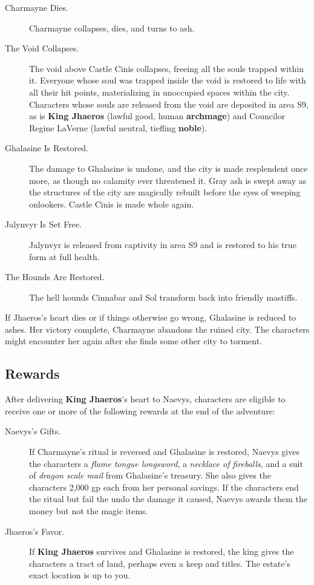 \documentclass[10pt,a4paper,twoside,bg=print,twocolumn,openany,nodeprecatedcode]{dndbook}
\begin{document}
\begin{description}
\item[Charmayne Dies.]
Charmayne collapses, dies, and turns to ash.
\item[The Void Collapses.]
The void above Castle Cinis collapses, freeing all the souls trapped within it. Everyone whose soul was trapped inside the void is restored to life with all their hit points, materializing in unoccupied spaces within the city. Characters whose souls are released from the void are deposited in area S9, as is \textbf{King Jhaeros} (lawful good, human \textbf{archmage}) and Councilor Regine LaVerne (lawful neutral, tiefling \textbf{noble}).
\item[Ghalasine Is Restored.]
The damage to Ghalasine is undone, and the city is made resplendent once more, as though no calamity ever threatened it. Gray ash is swept away as the structures of the city are magically rebuilt before the eyes of weeping onlookers. Castle Cinis is made whole again.
\item[Jalynvyr Is Set Free.]
Jalynvyr is released from captivity in area S9 and is restored to his true form at full health.
\item[The Hounds Are Restored.]
The hell hounds Cinnabar and Sol transform back into friendly mastiffs.
\end{description}

If Jhaeros's heart dies or if things otherwise go wrong, Ghalasine is reduced to ashes. Her victory complete, Charmayne abandons the ruined city. The characters might encounter her again after she finds some other city to torment.

\subsection{Rewards}
After delivering \textbf{King Jhaeros}'s heart to Naevys, characters are eligible to receive one or more of the following rewards at the end of the adventure:


\begin{description}
\item[Naevys's Gifts.]
If Charmayne's ritual is reversed and Ghalasine is restored, Naevys gives the characters a \textit{flame tongue longsword}, a \textit{necklace of fireballs}, and a suit of \textit{dragon scale mail} from Ghalasine's treasury. She also gives the characters 2,000 gp each from her personal savings. If the characters end the ritual but fail the undo the damage it caused, Naevys awards them the money but not the magic items.
\item[Jhaeros's Favor.]
If \textbf{King Jhaeros} survives and Ghalasine is restored, the king gives the characters a tract of land, perhaps even a keep and titles. The estate's exact location is up to you.
\end{description}
\end{document}
